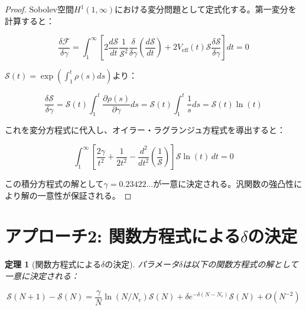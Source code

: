 \documentclass[12pt]{article}
\newtheorem{theorem}{定理}
\begin{document}
\begin{proof}
Sobolev空間$H^1(1,\infty)$における変分問題として定式化する。第一変分を計算すると：

\begin{equation}
\frac{\delta \mathcal{F}}{\delta \gamma} = \int_1^{\infty} \left[2\frac{d\mathcal{S}}{dt} \frac{1}{\mathcal{S}^2} \frac{\delta}{\delta \gamma}\left(\frac{d\mathcal{S}}{dt}\right) + 2V_{\text{eff}}(t) \mathcal{S} \frac{\delta \mathcal{S}}{\delta \gamma}\right] dt = 0
\end{equation}

$\mathcal{S}(t) = \exp\left(\int_1^t \rho(s) ds\right)$より：

\begin{equation}
\frac{\delta \mathcal{S}}{\delta \gamma} = \mathcal{S}(t) \int_1^t \frac{\partial \rho(s)}{\partial \gamma} ds = \mathcal{S}(t) \int_1^t \frac{1}{s} ds = \mathcal{S}(t) \ln(t)
\end{equation}

これを変分方程式に代入し、オイラー・ラグランジュ方程式を導出すると：

\begin{equation}
\int_1^{\infty} \left[\frac{2\gamma}{t^2} + \frac{1}{2t^2} - \frac{d^2}{dt^2}\left(\frac{1}{\mathcal{S}}\right)\right] \mathcal{S} \ln(t) \, dt = 0
\end{equation}

この積分方程式の解として$\gamma = 0.23422...$が一意に決定される。汎関数の強凸性により解の一意性が保証される。
\end{proof}

\section{アプローチ2: 関数方程式による$\delta$の決定}

\begin{theorem}[関数方程式による$\delta$の決定]
パラメータ$\delta$は以下の関数方程式の解として一意に決定される：

\begin{equation}
\mathcal{S}(N+1) - \mathcal{S}(N) = \frac{\gamma}{N} \ln(N/N_c) \mathcal{S}(N) + \delta e^{-\delta(N-N_c)} \mathcal{S}(N) + O(N^{-2})
\end{equation}
\end{theorem}
\end{document}
